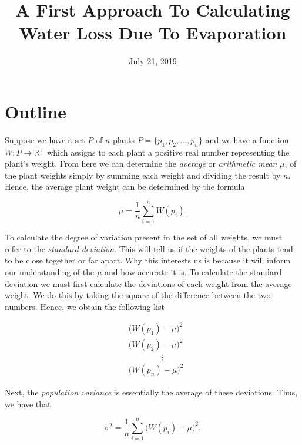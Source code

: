 \documentclass{article}
\theoremstyle{definition}
\theoremstyle{remark}
\theoremstyle{definition}
\begin{document}
\title{A First Approach To Calculating Water Loss Due To Evaporation}
\date{July 21, 2019}
\maketitle

\section{Outline}

Suppose we have a set $P$ of $n$ plants $P=\{p_1, p_2, \dots, p_n\}$ and we have a function $W\colon P\rightarrow\mathbb{R}^{+}$ which assigns to each plant a positive real number representing the plant's weight. From here we can determine the \textit{average} or \textit{arithmetic mean} $\mu$, of the plant weights simply by summing each weight and dividing the result by $n$. Hence, the average plant weight can be determined by the formula

\begin{equation}
    \mu=\frac{1}{n}\sum_{i=1}^{n}W(p_i).
\end{equation}

\noindent To calculate the degree of variation present in the set of all weights, we must refer to the \textit{standard deviation}. This will tell us if the weights of the plants tend to be close together or far apart. Why this interests us is because it will inform our understanding of the $\mu$ and how accurate it is. To calculate the standard deviation we must first calculate the deviations of each weight from the average weight. We do this by taking the square of the difference between the two numbers. Hence, we obtain the following list

\begin{equation*}
    \begin{split}
        &\big(W(p_1)-\mu\big)^2 \\
        &\big(W(p_2)-\mu\big)^2 \\
        &\quad\quad\quad\quad\vdots \\
        &\big(W(p_n)-\mu\big)^2
    \end{split}
\end{equation*}

\noindent Next, the \textit{population variance} is essentially the average of these deviations. Thus, we have that 

\begin{equation}
    \sigma^2=\frac{1}{n}\sum_{i=1}^{n}\big(W(p_i)-\mu\big)^2.
\end{equation}
\end{document}
